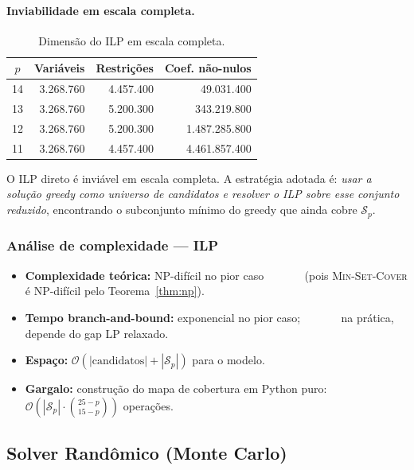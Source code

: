 \documentclass[12pt,a4paper]{article}
\theoremstyle{definition}
\newcommand{\bigo}[1]{\mathcal{O}\!\left(#1\right)}
\newcommand{\C}[2]{\binom{#1}{#2}}
\begin{document}
\paragraph{Inviabilidade em escala completa.}

\begin{table}[H]
\centering
\caption{Dimensão do ILP em escala completa.}
\begin{tabular}{crrr}
\toprule
$p$ & Variáveis & Restrições & Coef. não-nulos \\
\midrule
14 & 3.268.760 & 4.457.400 & 49.031.400 \\
13 & 3.268.760 & 5.200.300 & 343.219.800 \\
12 & 3.268.760 & 5.200.300 & 1.487.285.800 \\
11 & 3.268.760 & 4.457.400 & 4.461.857.400 \\
\bottomrule
\end{tabular}
\end{table}

O ILP direto é inviável em escala completa. A estratégia adotada é:
\emph{usar a solução greedy como universo de candidatos e resolver o ILP
sobre esse conjunto reduzido}, encontrando o subconjunto mínimo do greedy
que ainda cobre $\mathcal{S}_p$.

\subsubsection*{Análise de complexidade --- ILP}

\begin{itemize}
  \item \textbf{Complexidade teórica:} NP-difícil no pior caso
        (pois \textsc{Min-Set-Cover} é NP-difícil pelo Teorema~\ref{thm:np}).
  \item \textbf{Tempo branch-and-bound:} exponencial no pior caso;
        na prática, depende do gap LP relaxado.
  \item \textbf{Espaço:} $\bigo{|\text{candidatos}| + |\mathcal{S}_p|}$ para o modelo.
  \item \textbf{Gargalo:} construção do mapa de cobertura em Python puro:
        $\bigo{|\mathcal{S}_p| \cdot \C{25-p}{15-p}}$ operações.
\end{itemize}

\subsection{Solver Randômico (Monte Carlo)}
\end{document}
